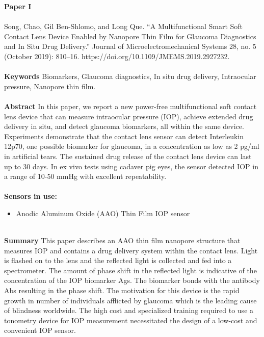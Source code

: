 \textbf{Paper I} 
\\ \\
\noindent
Song, Chao, Gil Ben-Shlomo, and Long Que. “A Multifunctional Smart Soft Contact Lens Device Enabled by Nanopore Thin Film for Glaucoma Diagnostics and In Situ Drug Delivery.” Journal of Microelectromechanical Systems 28, no. 5 (October 2019): 810–16. https://doi.org/10.1109/JMEMS.2019.2927232.\\ \\

\noindent
\textbf{Keywords} Biomarkers, Glaucoma diagnostics, In situ drug delivery, Intraocular pressure, Nanopore thin film.\\ \\

\noindent
\textbf{Abstract} In this paper, we report a new power-free multifunctional soft contact lens device that can measure intraocular pressure (IOP), achieve extended drug delivery in situ, and detect glaucoma biomarkers, all within the same device. Experiments demonstrate that the contact lens sensor can detect Interleukin 12p70, one possible biomarker for glaucoma, in a concentration as low as 2 pg/ml in artificial tears. The sustained drug release of the contact lens device can last up to 30 days. In ex vivo tests using cadaver pig eyes, the sensor detected IOP in a range of 10-50 mmHg with excellent repeatability.\\ \\

\noindent
\textbf{Sensors in use:}
\begin{itemize}
    \item Anodic Aluminum Oxide (AAO) Thin Film IOP sensor \\ \\
\end{itemize}

\noindent
\textbf{Summary} This paper describes an AAO thin film nanopore structure that measures IOP and contains a drug delivery system within the contact lens. Light is flashed on to the lens and the reflected light is collected and fed into a spectrometer. The amount of phase shift in the reflected light is indicative of the concentration of the IOP biomarker Ags. The biomarker bonds with the antibody Abs resulting in the phase shift. The motivation for this device is the rapid growth in number of individuals afflicted by glaucoma which is the leading cause of blindness worldwide. The high cost and specialized training required to use a tonometry device for IOP measurement necessitated the design of a low-cost and convenient IOP sensor. \\ \\

